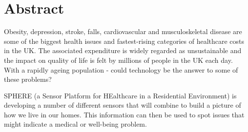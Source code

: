 \chapter*{Abstract}
%
%
%

Obesity, depression, stroke, falls, cardiovascular and musculoskeletal disease
are some of the biggest health issues and fastest-rising categories of healthcare
costs in the UK. The associated expenditure is widely regarded as unsustainable and the
impact on quality of life is felt by millions of people in the UK each day. With a
rapidly ageing population - could technology be the answer to some of these problems?

SPHERE (a Sensor Platform for HEalthcare in a Residential Environment)
is developing a number of different sensors that will combine to build a
picture of how we live in our homes. This information can then be used to spot issues
that might indicate a medical or well-being problem.

